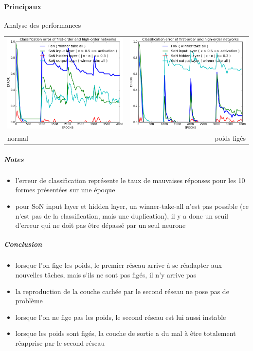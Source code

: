     \paragraph{Principaux}
      Analyse des performances
      \begin{center}
	\begin{tabular}{lr}
	  \hspace*{-1cm}
	  \includegraphics[width=250px]{data/expB1/err.png}
	  &
	  \includegraphics[width=250px]{data/expB1/err_block.png} \\
	  normal
	  &
	  poids figés
	\end{tabular}
      \end{center}
      \subparagraph{Notes}
	\begin{itemize}
	  \item l'erreur de classification représente le taux de mauvaises réponses pour les 10 formes présentées sur une époque
	  \item pour SoN input layer et hidden layer, un winner-take-all n'est pas possible (ce n'est pas de la classification, 
	  mais une duplication), il y a donc un seuil d'erreur qui ne doit pas être dépassé par un seul neurone
	\end{itemize}
      \subparagraph{Conclusion}
	\begin{itemize}
	  \item lorsque l'on fige les poids, le premier réseau arrive à se réadapter aux nouvelles tâches, mais s'ils ne sont
	  pas figés, il n'y arrive pas
	  \item la reproduction de la couche cachée par le second réseau ne pose pas de problème
	  \item lorsque l'on ne fige pas les poids, le second réseau est lui aussi instable
	  \item lorsque les poids sont figés, la couche de sortie a du mal à être totalement réapprise par le second réseau
	  
	\end{itemize}
